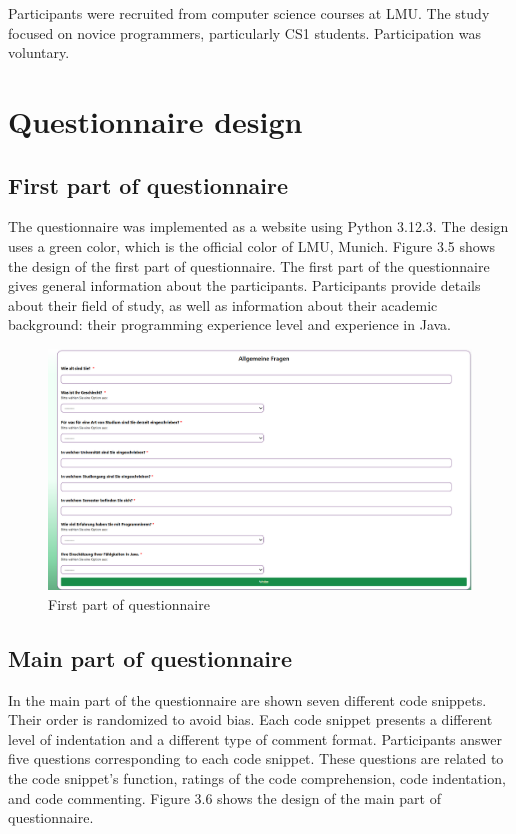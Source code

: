 Participants were recruited from computer science courses at LMU. The study focused on novice programmers, particularly CS1 students. Participation was voluntary.

\section{Questionnaire design}


\subsection{First part of questionnaire}



The questionnaire was implemented as a website using Python 3.12.3. The design uses a green color, which is the official color of LMU, Munich. 
Figure 3.5 shows the design of the first part of questionnaire. The first part of the questionnaire gives general information about the participants. 
Participants provide details about their field of study, as well as information about their academic background: their programming experience level and experience in Java. 
\begin{figure} [H]
  \centering
  \includegraphics[scale=0.45]{figures/allgemein.png}
  \caption{First part of questionnaire}
  \label{fig:AnhangsChor}
\end{figure}


\subsection{Main part of questionnaire}

In the main part of the questionnaire are shown seven different code snippets. Their order is randomized to avoid bias. Each code snippet presents a different level of indentation and a different type of comment format.
Participants answer five questions corresponding to each code snippet. These questions are related to the code snippet’s function, ratings of the code comprehension, code indentation, and code commenting. Figure 3.6 shows the design of the main part of questionnaire.


